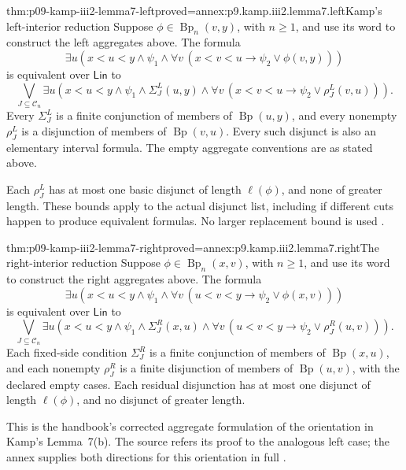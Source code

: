 \begin{hblemma}{thm:p09-kamp-iii2-lemma7-left}{proved=annex:p9.kamp.iii2.lemma7.left}{Kamp's left-interior reduction}
Suppose \(\phi\in\operatorname{Bp}_n(v,y)\), with \(n\geq1\),
and use its word to construct the left aggregates above. The formula
\[
 \exists u\left(x<u<y\land\psi_1\land
       \forall v\,(x<v<u\to\psi_2\lor\phi(v,y))\right)
\]
is equivalent over \(\mathsf{Lin}\) to
\[
 \bigvee_{J\subseteq\mathcal C_n}
 \exists u\left(x<u<y\land\psi_1\land\Sigma_J^L(u,y)\land
       \forall v\,(x<v<u\to\psi_2\lor\rho_J^L(v,u))\right).
\]
Every \(\Sigma_J^L\) is a finite conjunction of members of
\(\operatorname{Bp}(u,y)\), and every nonempty \(\rho_J^L\)
is a disjunction of members of \(\operatorname{Bp}(v,u)\).
Every such disjunct is also an elementary interval formula.
The empty aggregate conventions are as stated above.

Each \(\rho_J^L\) has at most one basic disjunct of length
\(\ell(\phi)\), and none of greater length. These bounds apply
to the actual disjunct list, including if different cuts happen to
produce equivalent formulas. No larger replacement bound is used
\cite[ch.~III, lemma~7(a), pp.~80--83]{Kamp1968}.
\end{hblemma}

\begin{hblemma}{thm:p09-kamp-iii2-lemma7-right}{proved=annex:p9.kamp.iii2.lemma7.right}{The right-interior reduction}
Suppose \(\phi\in\operatorname{Bp}_n(x,v)\), with \(n\geq1\),
and use its word to construct the right aggregates above. The formula
\[
 \exists u\left(x<u<y\land\psi_1\land
       \forall v\,(u<v<y\to\psi_2\lor\phi(x,v))\right)
\]
is equivalent over \(\mathsf{Lin}\) to
\[
 \bigvee_{J\subseteq\mathcal C_n}
 \exists u\left(x<u<y\land\psi_1\land\Sigma_J^R(x,u)\land
       \forall v\,(u<v<y\to\psi_2\lor\rho_J^R(u,v))\right).
\]
Each fixed-side condition \(\Sigma_J^R\) is a finite conjunction
of members of \(\operatorname{Bp}(x,u)\), and each nonempty
\(\rho_J^R\) is a finite disjunction of members of
\(\operatorname{Bp}(u,v)\), with the declared empty cases.
Each residual disjunction has at most one disjunct of length
\(\ell(\phi)\), and no disjunct of greater length.

This is the handbook's corrected aggregate formulation of the orientation
in Kamp's Lemma~7(b). The source refers its proof to the analogous left case;
the annex supplies both directions for this orientation in full
\cite[ch.~III, lemma~7(b), p.~81]{Kamp1968}.
\end{hblemma}

